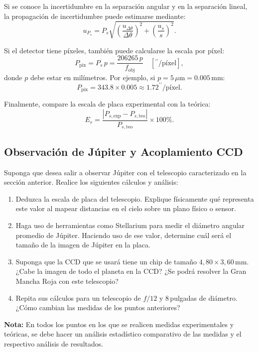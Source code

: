 

Si se conoce la incertidumbre en la separación angular y en la separación lineal, la propagación de incertidumbre puede estimarse mediante:
$$
u_{P_s}=P_s
\sqrt{
\left(\frac{u_{\Delta\theta}}{\Delta\theta}\right)^2
+
\left(\frac{u_s}{s}\right)^2
}.
$$

Si el detector tiene píxeles, también puede calcularse la escala por píxel:
$$
P_{\mathrm{pix}}=P_s\,p
=
\frac{206265\,p}{f_{\mathrm{obj}}}
\quad \left[{}^{\prime\prime}/\text{píxel}\right],
$$
donde $p$ debe estar en milímetros. Por ejemplo, si $p=5\,\mu\mathrm{m}=0.005\,\mathrm{mm}$:
$$
P_{\mathrm{pix}}
=
343.8\times 0.005
\approx
1.72^{\prime\prime}/\text{píxel}.
$$

Finalmente, compare la escala de placa experimental con la teórica:
$$
E_r=
\frac{\left|P_{s,\mathrm{exp}}-P_{s,\mathrm{teo}}\right|}
{P_{s,\mathrm{teo}}}
\times 100\%.
$$


\subsection{Observación de Júpiter y Acoplamiento CCD}

Suponga que desea salir a observar Júpiter con el telescopio caracterizado en la sección anterior. Realice los siguientes cálculos y análisis:

\begin{enumerate}
    \item Deduzca la escala de placa del telescopio. Explique físicamente qué representa este valor al mapear distancias en el cielo sobre un plano físico o sensor.
    \item Haga uso de herramientas como Stellarium para medir el diámetro angular promedio de Júpiter. Haciendo uso de ese valor, determine cuál será el tamaño de la imagen de Júpiter en la placa.
    \item Suponga que la CCD que se usará tiene un chip de tamaño $4{,}80 \times 3{,}60$\,mm. ¿Cabe la imagen de todo el planeta en la CCD? ¿Se podrá resolver la Gran Mancha Roja con este telescopio?
    \item Repita sus cálculos para un telescopio de $f/12$ y 8\,pulgadas de diámetro. ¿Cómo cambian las medidas de los puntos anteriores?
\end{enumerate}

\vspace{0.5cm}

\textbf{Nota:} En todos los puntos en los que se realicen medidas experimentales y teóricas, se debe hacer un análisis estadístico comparativo de las medidas y el respectivo análisis de resultados.
